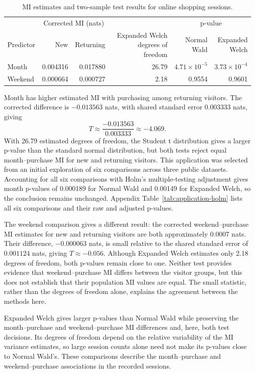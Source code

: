 \begin{table}[H]
\centering
\caption{MI estimates and two-sample test results for online shopping sessions.}
\label{tab:shoppers-application}
\begingroup
\setlength{\tabcolsep}{4pt}
\begin{tabular}{@{}lrrrrr@{}}
\toprule
 & \multicolumn{2}{c}{Corrected MI (nats)} & & \multicolumn{2}{c}{p-value}\\
\cmidrule(lr){2-3}\cmidrule(l){5-6}
Predictor & New & Returning & \shortstack{Expanded Welch\\degrees of freedom}
 & \shortstack{Normal\\Wald} & \shortstack{Expanded\\Welch}\\
\midrule
Month & 0.004316 & 0.017880 & 26.79 & \(4.71\times10^{-5}\) & \(3.73\times10^{-4}\)\\
Weekend & 0.000664 & 0.000727 & 2.18 & 0.9554 & 0.9601\\
\bottomrule
\end{tabular}
\endgroup
\end{table}

Month has higher estimated MI with purchasing among returning visitors.
The corrected difference is \(-0.013563\) nats, with shared standard error
\(0.003333\) nats, giving
\begin{equation}
  T\approx\frac{-0.013563}{0.003333}\approx-4.069.
  \label{eq:shoppers-month-statistic}
\end{equation}
With 26.79 estimated degrees of freedom, the Student t distribution gives
a larger p-value than the standard normal distribution, but both tests
reject equal month--purchase MI for new and returning visitors. This
application was selected from an initial exploration
of six comparisons across three public datasets. Accounting for all six
comparisons with Holm's multiple-testing adjustment \citep{holm1979}
gives month p-values of 0.000189 for Normal Wald and 0.00149 for Expanded
Welch, so the conclusion remains unchanged. Appendix
Table~\ref{tab:application-holm} lists all six comparisons and their raw
and adjusted p-values.

The weekend comparison gives a different result: the corrected
weekend--purchase MI estimates for new and returning visitors are both
approximately 0.0007 nats. Their difference,
\(-0.000063\) nats, is small relative to the shared standard error of
\(0.001124\) nats, giving \(T\approx-0.056\). Although Expanded Welch
estimates only 2.18 degrees of freedom, both p-values remain close to one.
Neither test provides evidence that weekend--purchase MI differs between
the visitor groups, but this does not establish that their population MI
values are equal. The small statistic, rather than the degrees of freedom
alone, explains the agreement between the methods here.

Expanded Welch gives larger p-values than Normal Wald while preserving the
month--purchase and weekend--purchase MI differences and, here, both test
decisions. Its degrees of freedom depend on the relative variability of
the MI variance estimates, so large session counts alone need not make its
p-values close to Normal Wald's. These comparisons describe the
month--purchase and weekend--purchase associations in the recorded sessions.
